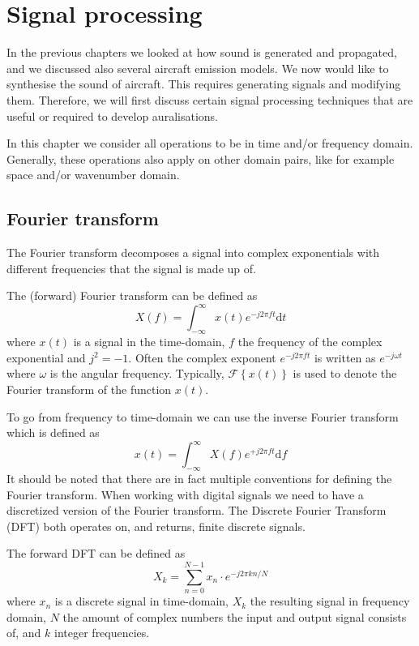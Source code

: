 \section{Signal processing}
In the previous chapters we looked at how sound is generated and propagated, and
we discussed also several aircraft emission models.
We now would like to synthesise the sound of aircraft. This requires generating
signals and modifying them. Therefore, we will first discuss certain signal
processing techniques that are useful or required to develop auralisations.


In this chapter we consider all operations to be in time and/or frequency
domain. Generally, these operations also apply on other domain pairs, like for
example space and/or wavenumber domain.


\newpage
\subsection{Fourier transform}
The Fourier transform decomposes a signal into complex exponentials with different frequencies that the signal is made up of.

The (forward) Fourier transform can be defined as
\begin{equation}
 X(f) = \int_{-\infty}^{\infty} x(t) e^{-j 2 \pi f t} \mathrm{d} t
\end{equation}
where $x(t)$ is a signal in the time-domain, $f$ the frequency of the complex exponential and $j^2=-1$.
Often the complex exponent $e^{-j 2 \pi f t}$ is written as $e^{-j \omega t}$ where $\omega$ is the angular frequency.
Typically, $\mathcal{F} \left\{ x(t) \right\}$ is used to denote the Fourier transform of the function $x(t)$.

To go from frequency to time-domain we can use the inverse Fourier transform which is defined as
\begin{equation}
 x(t) = \int_{-\infty}^{\infty} X(f) e^{+j 2 \pi f t} \mathrm{d} f
\end{equation}
It should be noted that there are in fact multiple conventions for defining the Fourier transform.
When working with digital signals we need to have a discretized version of the
Fourier transform. The Discrete Fourier Transform (DFT) both operates on, and
returns, finite discrete signals.

The forward DFT can be defined as
\begin{equation}
 X_k = \sum_{n=0}^{N-1} x_n \cdot e^{-j 2\pi k n / N}
\end{equation}
where $x_n$ is a discrete signal in time-domain, $X_k$ the resulting signal in
frequency domain, $N$ the amount of complex numbers the input and output signal
consists of, and $k$ integer frequencies.

